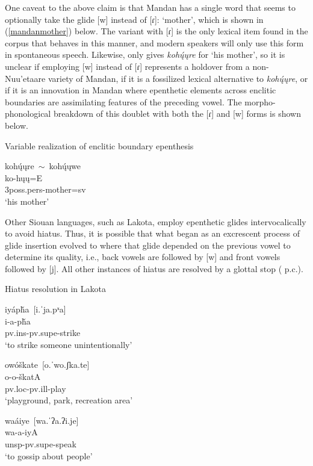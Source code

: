 One caveat to the above claim is that Mandan has a single word that seems to optionally take the glide [w] instead of [ɾ]: `mother', which is shown in (\ref{mandanmother}) below. The variant with [ɾ] is the only lexical item found in the corpus that behaves in this manner, and modern speakers will only use this form in spontaneous speech. Likewise, \citet{maximilian1839} only gives \textit{kohų́ųre} for `his mother', so it is unclear if employing [w] instead of [ɾ] represents a holdover from a non-Nuu'etaare variety of Mandan, if it is a fossilized lexical alternative to \textit{kohų́ųre}, or if it is an innovation in Mandan where epenthetic elements across enclitic boundaries are assimilating features of the preceding vowel. The morpho-phonological breakdown of this doublet with both the [ɾ] and [w] forms is shown below.

\begin{exe}

\item\label{mandanmother} Variable realization of enclitic boundary epenthesis

\glll kohų́ųre~$\sim$~kohų́ųwe\\
	ko-hųų=E\\
	3poss.pers-\textnormal{mother}=sv\\
\glt	`his mother' \citep[83]{hollow1970}
\end{exe}

Other Siouan languages, such as Lakota, employ epenthetic glides intervocalically to avoid hiatus. Thus, it is possible that what began as an excrescent process of glide insertion evolved to where that glide depended on the previous vowel to determine its quality, i.e., back vowels are followed by [w] and front vowels followed by [j]. All other instances of hiatus are resolved by a glottal stop (\citeauthor{mirzayan2010} p.c.).

\largerpage
\begin{exe}
\item Hiatus resolution in Lakota
\begin{xlist}
\item \glll iyápȟa~\textnormal{[i.ˈja.pˣa]}\\
	 i-a-pȟa\\
	 pv.ins-pv.supe-\textnormal{strike}\\
\glt	`to strike someone unintentionally' \citep[249]{ullrich2011}
\item \glll owóškate~\textnormal{[o.ˈwo.ʃka.te]}\\
	 o-o-škatA\\
	 pv.loc-pv.ill-\textnormal{play}\\
\glt	`playground, park, recreation area' \citep[442]{ullrich2011}
\item \glll waáiye~\textnormal{[wa.ˈʔa.ʔi.je]}\\
	wa-a-iyA\\
	unsp-pv.supe-\textnormal{speak}\\
\glt	`to gossip about people' \citep[579]{ullrich2011}

\end{xlist}
\end{exe}

